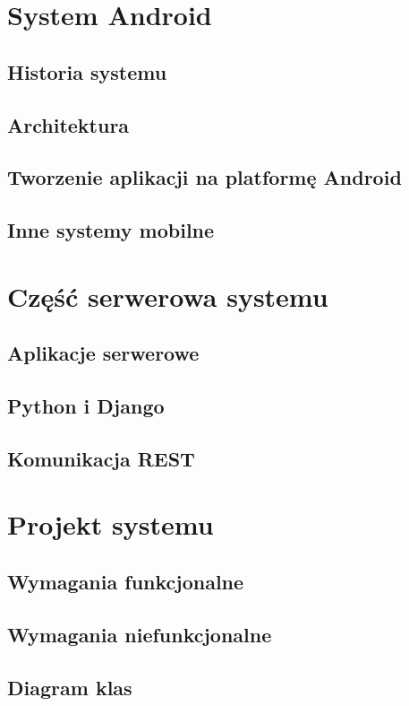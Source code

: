\section{System Android}
\subsection{Historia systemu}
\subsection{Architektura}
\subsection{Tworzenie aplikacji na platformę Android}
\subsection{Inne systemy mobilne}

\section{Część serwerowa systemu}
\subsection{Aplikacje serwerowe}
\subsection{Python i Django}
\subsection{Komunikacja REST}


\section{Projekt systemu}
\subsection{Wymagania funkcjonalne}
\subsection{Wymagania niefunkcjonalne}
\subsection{Diagram klas}
